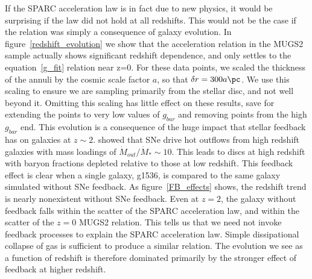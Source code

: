 If the SPARC acceleration law is in fact due to new physics, it would be
surprising if the law did not hold at all redshifts.  This would not be the case
if the relation was simply a consequence of galaxy evolution.  In
figure~\ref{redshift_evolution} we show that the acceleration relation in the MUGS2
sample actually shows significant redshift dependence, and only settles to
the equation~\ref{g_fit} relation near z=0.  For these data points, we scaled
the thickness of the annuli by the cosmic scale factor $a$, so that $\delta r =
300a\pc$.  We use this scaling to ensure we are sampling primarily from the
stellar disc, and not well beyond it.  Omitting this scaling has little effect
on these results, save for extending the points to very low values of $g_{bar}$
and removing points from the high $g_{bar}$ end.  This evolution is a
consequence of the huge impact that stellar feedback has on galaxies at
$z\sim2$.  \citet{Keller2015} showed that SNe drive hot outflows from high
redshift galaxies with mass loadings of $\dot M_{out}/\dot M_* \sim 10$.  This
leads to discs at high redshift with baryon fractions depleted relative to those at
low redshift.  This feedback effect is clear when a single galaxy, g1536, is
compared to the same galaxy simulated without SNe feedback.  As
figure~\ref{FB_effects} shows, the redshift trend is nearly nonexistent without SNe
feedback.  Even at $z=2$, the galaxy without feedback falls within the scatter
of the SPARC acceleration law, and within the scatter of the $z=0$ MUGS2
relation.  This tells us that we need not invoke feedback processes to explain
the SPARC acceleration law.  Simple dissipational collapse of gas is sufficient
to produce a similar relation.  The evolution we see as a function of redshift
is therefore dominated primarily by the stronger effect of feedback at higher
redshift.

